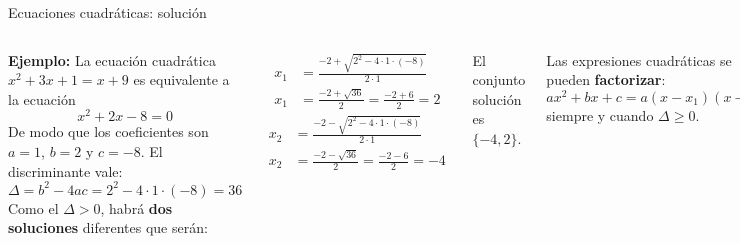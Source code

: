 \documentclass[9pt, aspectratio=169]{beamer}
\begin{document}
\begin{frame}{Ecuaciones cuadráticas: solución}
\begin{columns}
    \textbf{Ejemplo:} La ecuación cuadrática $x^2 + 3x + 1 = x + 9$ es equivalente a la ecuación
    \[ x^2 + 2x -8 = 0 \]
De modo que los coeficientes son $a = 1$, $b = 2$ y $c = -8$. El discriminante vale:
\[ \Delta = b^2 - 4 a c = 2^2 - 4 \cdot 1 \cdot (-8) = 36 \]
Como el $\Delta > 0$, habrá \textbf{dos soluciones} diferentes que serán:
\begin{columns}[t]
    \cx
    \begin{align*}
        x_1 &= \frac{-2 + \sqrt{2^2 - 4 \cdot 1 \cdot (-8)}}{2 \cdot 1} \\
        x_1 &= \frac{-2 + \sqrt{36}}{2} = \frac{-2+6}{2} = 2
    \end{align*}
    \cx
    \begin{align*}
        x_2 &= \frac{-2 - \sqrt{2^2 - 4 \cdot 1 \cdot (-8)}}{2 \cdot 1} \\
        x_2 &= \frac{-2 - \sqrt{36}}{2} = \frac{-2-6}{2} = -4
    \end{align*}
\end{columns} \medskip
\centering El conjunto solución es $\{-4, 2\}$.
\pause

Las expresiones cuadráticas se pueden \textbf{factorizar}:
\[ ax^2 + bx + c = a(x - x_1)(x-x_2) \]
siempre y cuando $\Delta \geq 0$.

Del ejemplo anterior:
\[x^2 + 2x -8 = (x-2)(x+4) \]
\pause

\begin{alertblock}{\centering \faInfoCircle}
    Una ecuación puede escribirse como $f(x) = 0$ donde $f$ es una \textbf{función}. A las soluciones de la ecuación se las denomina \textbf{raíces} o \textbf{ceros} de la función $f$.
\end{alertblock}
\end{columns}
\end{frame}
\end{document}
